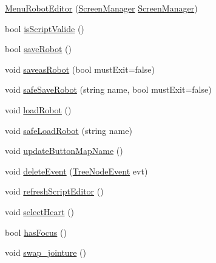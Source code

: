 \begin{DoxyCompactItemize}
\item 
\hyperlink{classgearit_1_1src_1_1_g_u_i_1_1_menu_robot_editor_aa07e514aaaa0c00e08adec3d7c3fe93d}{Menu\+Robot\+Editor} (\hyperlink{classgearit_1_1xna_1_1_screen_manager}{Screen\+Manager} \hyperlink{classgearit_1_1xna_1_1_screen_manager}{Screen\+Manager})
\item 
bool \hyperlink{classgearit_1_1src_1_1_g_u_i_1_1_menu_robot_editor_a4e251ee3777b735d52ac38d39dc86860}{is\+Script\+Valide} ()
\item 
bool \hyperlink{classgearit_1_1src_1_1_g_u_i_1_1_menu_robot_editor_af0a02fe9e0bed744f9590f6eceb8118a}{save\+Robot} ()
\item 
void \hyperlink{classgearit_1_1src_1_1_g_u_i_1_1_menu_robot_editor_aba5a285d4cc2f4c4113d9ab2bf453c45}{saveas\+Robot} (bool must\+Exit=false)
\item 
void \hyperlink{classgearit_1_1src_1_1_g_u_i_1_1_menu_robot_editor_a320b6d6a6fbd091595b2c7b4872130f5}{safe\+Save\+Robot} (string name, bool must\+Exit=false)
\item 
void \hyperlink{classgearit_1_1src_1_1_g_u_i_1_1_menu_robot_editor_aa9d70bced5bd4d8a7caa7c4bd76b72af}{load\+Robot} ()
\item 
void \hyperlink{classgearit_1_1src_1_1_g_u_i_1_1_menu_robot_editor_a4b0c4d8a8c8aab9c086cf19ac4197aa3}{safe\+Load\+Robot} (string name)
\item 
void \hyperlink{classgearit_1_1src_1_1_g_u_i_1_1_menu_robot_editor_a41250aed6571198ee4b688eec16c3f62}{update\+Button\+Map\+Name} ()
\item 
void \hyperlink{classgearit_1_1src_1_1_g_u_i_1_1_menu_robot_editor_ac996c0215993bf09ac9f2bbdc2bfc70d}{delete\+Event} (\hyperlink{classgearit_1_1src_1_1_g_u_i_1_1_tree_node_event}{Tree\+Node\+Event} evt)
\item 
void \hyperlink{classgearit_1_1src_1_1_g_u_i_1_1_menu_robot_editor_ac98ed82a6bccb9c7deb2c9b645cba9a3}{refresh\+Script\+Editor} ()
\item 
void \hyperlink{classgearit_1_1src_1_1_g_u_i_1_1_menu_robot_editor_ad9271fd9c7498c776a25d6ce32b33d85}{select\+Heart} ()
\item 
bool \hyperlink{classgearit_1_1src_1_1_g_u_i_1_1_menu_robot_editor_a409d08034c3cae82a8e8ab0bcbc6ff63}{has\+Focus} ()
\item 
void \hyperlink{classgearit_1_1src_1_1_g_u_i_1_1_menu_robot_editor_a8686c70ba40895fb36528ac81486d479}{swap\+\_\+jointure} ()
\item 

\end{DoxyCompactItemize}
